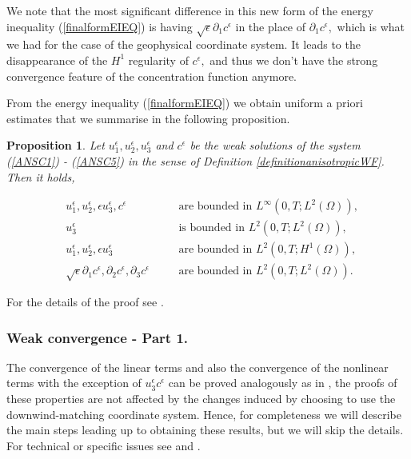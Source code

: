 \documentclass[11pt, a4paper]{article}
\newtheorem{prop}{Proposition}
\begin{document}
We note that the most significant difference in this new form of the energy inequality (\ref{finalformEIEQ}) is having $\sqrt{\epsilon} \partial_1 c^\epsilon$ in the place of $\partial_1 c^\epsilon,$ which is what we had for the case of the geophysical coordinate system. It leads to the disappearance of the $H^1$ regularity of $c^\epsilon,$ and thus we don't have the strong convergence feature of the concentration function anymore.

From  the energy inequality (\ref{finalformEIEQ}) we obtain uniform a priori estimates that we summarise in the following proposition.

\begin{prop} \label{aprioriprop}
Let $u^\epsilon_1, u^\epsilon_2, u^\epsilon_3$ and $c^\epsilon$ be the weak solutions of the system (\ref{ANSC1}) - (\ref{ANSC5}) in the sense of Definition \ref{definitionanisotropicWF}. Then it holds,

\begin{align}
& u^\epsilon_1, u^\epsilon_2, \epsilon u^\epsilon_3, c^\epsilon & \quad & \text{are bounded in $L^\infty (0,T; L^2(\Omega)),$} \label{proposition1} \\
& u^\epsilon_3 & \quad & \text{is bounded in $L^2 (0,T; L^2(\Omega)),$} \label{propositionExtra} \\
& u^\epsilon_1, u^\epsilon_2, \epsilon u^\epsilon_3 & \quad & \text{are bounded in $L^2(0,T; H^1(\Omega)),$} \label{proposition2} \\
& \sqrt{\epsilon} \partial_1 c^\epsilon, \partial_2 c^\epsilon, \partial_3 c^\epsilon & \quad & \text{are bounded in $L^2(0,T;L^2(\Omega)).$} \label{proposition3}
\end{align}

\end{prop}

For the details of the proof see \cite{pollatmws2019}.

\subsubsection{Weak convergence - Part 1.}

The convergence of the linear terms and also the convergence of the nonlinear terms with the exception of $u_3^\epsilon c^\epsilon$ can be proved analogously as in  \cite{pollatmws2019}, the proofs of these properties are not affected by the changes induced by choosing to use the downwind-matching coordinate system. Hence, for completeness we will describe the main steps leading up to obtaining these results, but we will skip the details. For technical or specific issues see \cite{azerad2001mathematical} and \cite{pollatmws2019}.
\end{document}
